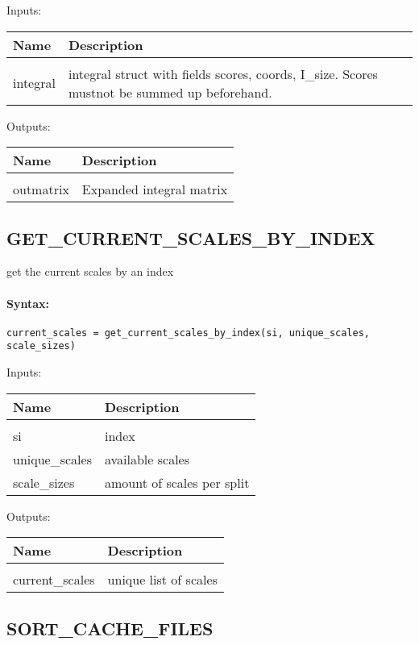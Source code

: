 Inputs:

\begin{tabular}{|l|p{5cm}|}
\hline
\textbf{Name} & \textbf{Description} \\
\hline \hline \\
integral & integral struct with fields scores, coords, I\_size. Scores mustnot be summed up beforehand.  \\ \hline
\end{tabular}
Outputs:

\begin{tabular}{|l|p{5cm}|}
\hline
\textbf{Name} & \textbf{Description} \\
\hline \hline \\
outmatrix & Expanded integral matrix  \\ \hline
\end{tabular}

\subsection{GET\_CURRENT\_SCALES\_BY\_INDEX}

get the current scales by an index

\paragraph{Syntax:} \verb|current_scales = get_current_scales_by_index(si, unique_scales, scale_sizes)|

Inputs:

\begin{tabular}{|l|p{5cm}|}
\hline
\textbf{Name} & \textbf{Description} \\
\hline \hline \\
si & index  \\ \hline
unique\_scales & available scales  \\ \hline
scale\_sizes & amount of scales per split  \\ \hline
\end{tabular}
Outputs:

\begin{tabular}{|l|p{5cm}|}
\hline
\textbf{Name} & \textbf{Description} \\
\hline \hline \\
current\_scales & unique list of scales  \\ \hline
\end{tabular}

\subsection{SORT\_CACHE\_FILES}

